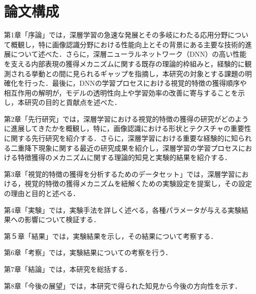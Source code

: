 \section{論文構成}
第1章「序論」では，深層学習の急速な発展とその多岐にわたる応用分野について概観し，特に画像認識分野における性能向上とその背景にある主要な技術的進展について述べた．さらに，深層ニューラルネットワーク（DNN）の高い性能を支える内部表現の獲得メカニズムに関する既存の理論的枠組みと，経験的に観測される挙動との間に見られるギャップを指摘し，本研究の対象とする課題の明確化を行った．最後に，DNNの学習プロセスにおける視覚的特徴の獲得順序や相互作用の解明が，モデルの透明性向上や学習効率の改善に寄与することを示し，本研究の目的と貢献点を述べた．\par
第2章「先行研究」では，深層学習における視覚的特徴の獲得の研究がどのように進展してきたかを概観し，特に，画像認識における形状とテクスチャの重要性に関する先行研究を紹介する．さらに，深層学習における重要な経験的に知られる二重降下現象に関する最近の研究成果を紹介し，深層学習の学習プロセスにおける特徴獲得のメカニズムに関する理論的知見と実験的結果を紹介する．\par
第3章「視覚的特徴の獲得を分析するためのデータセット」では，深層学習における，視覚的特徴の獲得メカニズムを紐解くための実験設定を提案し，その設定の理由と目的と述べる．\par
第4章「実験」では，実験手法を詳しく述べる，各種パラメータが与える実験結果への影響について検証する．\par
第５章「結果」では，実験結果を示し，その結果について考察する．\par
第6章「考察」では，実験結果についての考察を行う．\par
第7章「結論」では，本研究を総括する．\par
第8章「今後の展望」では，本研究で得られた知見から今後の方向性を示す．\par
\newpage

